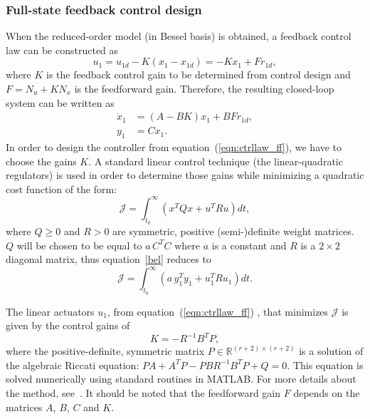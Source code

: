 \documentclass[12pt]{iopart}
\begin{document}
\subsubsection{Full-state feedback control design} 

When the reduced-order model (in Bessel basis) is obtained, a feedback control law can be constructed as
\begin{equation}
   u_1 = u_{1d} - K(x_1 - x_{1d}) = - Kx_1 + Fr_{1d},
   \label{eqn:ctrllaw_ff}
\end{equation}
where $K$ is the feedback control gain to be determined from control design and $F = N_u + K N_x$ is the feedforward gain.  Therefore, the resulting closed-loop system can be written as
\begin{eqnarray}
      \dot{x}_1 &= (A-BK) x_1 + BF r_{1d}, \\
      y_1 &= C x_1.
\end{eqnarray}
In order to design the controller from equation~(\ref{eqn:ctrllaw_ff}), we have to choose the gains $K$.
A  standard linear control technique (the linear-quadratic regulators) is used in order to determine those gains while minimizing a quadratic cost function of the form:
\begin{equation}
 \mathcal{J} = \int_{t_0}^\infty \left( x^T Q x + u^T R u \right) dt,
 \label{bel}
\end{equation}
where $Q\ge 0$ and $R>0$ are symmetric, positive (semi-)definite weight matrices. $Q$ will be chosen to be equal to $a \, C^{T} C$ where $a$ is a constant and $R$ is a $2 \times 2$ diagonal matrix, thus equation~\ref{bel} reduces to
\begin{equation}
   \mathcal{J} = \int_{t_0}^\infty \left( a \, y_1^T y_1 + u_1^T R u_1 \right) dt.
\end{equation}

 
The linear actuators $u_1$, from equation~(\ref{eqn:ctrllaw_ff}) , that minimizes $\mathcal{J}$ is given by the control gains of
\begin{equation}
   K  = - R^{-1} B^T P,
\end{equation}
where the positive-definite, symmetric matrix $P \in \mathbb{R}^{(r+2) \times (r+2)}$ is a solution of the algebraic Riccati equation: $P {A} + {A}^T P - P {B} R^{-1} B^T P + Q = 0$.  This equation is solved numerically using standard routines in MATLAB. For more details about the method, see~\cite{SandP, AandM, Stengel}.
It should be noted that the feedforward gain $F$  depends on the matrices $A$, $B$, $C$ and $K$.
\end{document}
